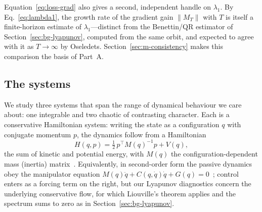 \documentclass[11pt]{article}
\newcommand{\norm}[1]{\left\lVert #1 \right\rVert}
\begin{document}
Equation~\eqref{eq:loss-grad} also gives a second, independent handle on $\lambda_1$. By Eq.~\eqref{eq:lambda1}, the growth rate of the gradient gain $\norm{M_T}$ with $T$ is itself a finite-horizon estimate of $\lambda_1$---distinct from the Benettin/QR estimator of Section~\ref{sec:bg-lyapunov}, computed from the same orbit, and expected to agree with it as $T\to\infty$ by Oseledets. Section~\ref{sec:m-consistency} makes this comparison the basis of Part~A.

\subsection{The systems}\label{sec:bg-systems}

We study three systems that span the range of dynamical behaviour we care about: one integrable and two chaotic of contrasting character. Each is a conservative Hamiltonian system: writing the state as a configuration $q$ with conjugate momentum $p$, the dynamics follow from a Hamiltonian
\begin{equation}
H(q,p) = \tfrac{1}{2}\,p^\top M(q)^{-1} p + V(q),
\label{eq:hamiltonian}
\end{equation}
the sum of kinetic and potential energy, with $M(q)$ the configuration-dependent mass (inertia) matrix~\cite{arnold1989mathematical}. Equivalently, in second-order form the passive dynamics obey the manipulator equation $M(q)\ddot q + C(q,\dot q)\dot q + G(q) = 0$~\cite{tedrake2023underactuated}; control enters as a forcing term on the right, but our Lyapunov diagnostics concern the underlying conservative flow, for which Liouville's theorem applies and the spectrum sums to zero as in Section~\ref{sec:bg-lyapunov}.
\end{document}

